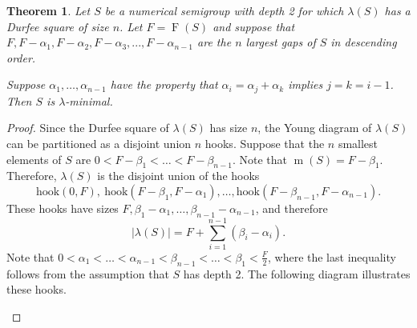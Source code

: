 \documentclass[10pt,a4paper]{amsart}
\newtheorem{theorem}{Theorem}
\DeclareMathOperator{\F}{F}
\newcommand{\hook}{\text{hook}}
\DeclareMathOperator{\m}{m}
\begin{document}
\begin{theorem}
    \label{general durfee}
    Let $S$ be a numerical semigroup with depth 2 for which $\lambda(S)$ has a Durfee square of size $n$. Let $F = \F(S)$ and suppose that $F, F-\alpha_1, F-\alpha_2, F-\alpha_3,...,F-\alpha_{n-1}$ are the $n$ largest gaps of $S$ in descending order.
    
Suppose $\alpha_1,\ldots, \alpha_{n-1}$ have the property that $\alpha_i=\alpha_j+\alpha_k$ implies $j=k=i-1$.
    Then $S$ is $\lambda$-minimal.
\end{theorem}

\begin{proof}
Since the Durfee square of $\lambda(S)$ has size $n$, the Young diagram of $\lambda(S)$ can be partitioned as a disjoint union $n$ hooks. Suppose that the $n$ smallest elements of $S$ are $0<F-\beta_1<\dots<F-\beta_{n-1}$. Note that $\m(S)=F-\beta_1$. Therefore, $\lambda(S)$ is the disjoint union of the hooks 
\[
\hook(0,F),\ \hook(F-\beta_1,F-\alpha_1),\ldots, \hook(F-\beta_{n-1},F-\alpha_{n-1}).
\]
These hooks have sizes $F, \beta_1-\alpha_1,\dots, \beta_{n-1}-\alpha_{n-1}$, and therefore 
\[
|\lambda(S)|=F+\sum_{i=1}^{n-1}(\beta_i-\alpha_i).
\]
Note that $0<\alpha_1<\dots<\alpha_{n-1}<\beta_{n-1}<\dots<\beta_1<\frac{F}{2}$, where the last inequality follows from the assumption that $S$ has depth 2.
The following diagram illustrates these hooks.
\begin{center}
\begin{figure}
\end{figure}
\end{center}
\end{proof}
\end{document}
